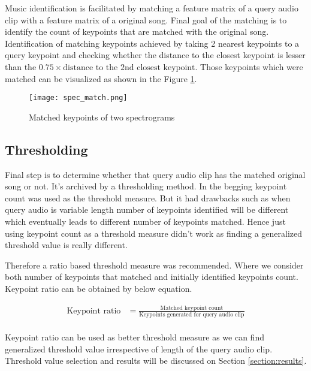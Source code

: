 Music identification is facilitated by matching a feature matrix of a query audio clip with a feature matrix of a original song. Final goal
of the matching is to identify the count of keypoints that are matched with the original song. Identification of matching keypoints achieved
by taking 2 nearest keypoints to a query keypoint and checking whether the distance to the closest keypoint is lesser than 
the \(0.75 \times \text{distance to the 2nd closest keypoint}\). Those keypoints which were matched can be visualized as shown in the 
Figure \ref{fig:spectrogram_match}.

\begin{figure}[H]
    \centering
    \texttt{[image: spec\_match.png]}
    \caption{Matched keypoints of two spectrograms}
    \label{fig:spectrogram_match}
  \end{figure}

\subsection{Thresholding}

Final step is to determine whether that query audio clip has the matched original song or not. It's archived by a thresholding method. 
In the begging keypoint count was used as the threshold measure. But it had drawbacks such as when query audio is variable length
number of keypoints identified will be different which eventually leads to different number of keypoints matched. Hence just using
keypoint count as a threshold measure didn't work as finding a generalized threshold value is really different. 

Therefore a ratio based threshold measure was recommended. Where we consider both number of keypoints that matched and initially identified 
keypoints count. Keypoint ratio can be obtained by below equation.

\begin{align*}
    \text{Keypoint ratio} &= \frac{\text{Matched keypoint count}}{\text{Keypoints generated for query audio clip}}\\
\end{align*}

Keypoint ratio can be used as better threshold measure as we can find generalized threshold value irrespective of length of the query audio clip. 
Threshold value selection and results will be discussed on Section \ref{section:results}. 